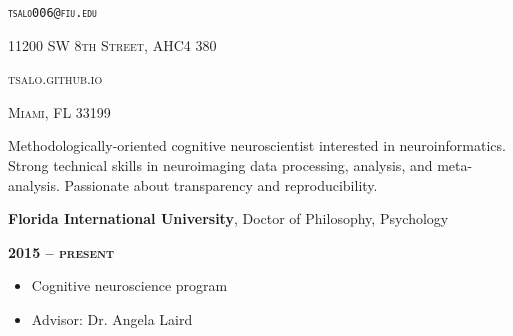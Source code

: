 \documentclass[10pt]{article}
\date{}
\newcommand{\namestyle}{\Huge \fontfamily{pcr}\selectfont}
\newcommand{\iconstyle}{\LARGE}
\newcommand{\headstyle}{\scshape \normalsize \textcolor{light-gray}}
\newcommand{\sectionstyle}{\LARGE \fontfamily{pcr}\selectfont}
\begin{document}
\begin{center}
	\namestyle{TAYLOR SALO}

	\bigskip

	\iconstyle{\href{https://github.com/tsalo}{\faGithubSquare}}
	\enspace
	\iconstyle{\href{https://www.researchgate.net/profile/Taylor_Salo}{}}
	\enspace
	\iconstyle{\href{https://scholar.google.com/citations?user=YbH1akIAAAAJ}{}}
	\enspace
	\iconstyle{\href{https://osf.io/iwpvm/}{}}
\end{center}

\begin{minipage}[t]{.5\linewidth}
\flushleft
\headstyle{\nolinkurl{tsalo006@fiu.edu}}
\end{minipage}
\hfill
\begin{minipage}[t]{.5\linewidth}
\flushright
\headstyle{11200 SW 8th Street, AHC4 380}
\end{minipage}

\begin{minipage}[t]{.3\linewidth}
\flushleft
\headstyle{tsalo.github.io}
\end{minipage}
\hfill
\begin{minipage}[t]{.7\linewidth}
\flushright
\headstyle{Miami, FL 33199}
\end{minipage}

\bigskip

\begin{center}\sectionstyle{PROFILE}\end{center}

Methodologically-oriented cognitive neuroscientist interested in
neuroinformatics. Strong technical skills in neuroimaging data
processing, analysis, and meta-analysis. Passionate about transparency
and reproducibility.

\bigskip

\begin{center}\sectionstyle{EDUCATION}\end{center}

\begin{minipage}[t]{.7\linewidth}
\flushleft
\noindent
\textbf{Florida International University}, Doctor of Philosophy,
Psychology
\end{minipage}
\hfill
\begin{minipage}[t]{.3\linewidth}
\flushright
\noindent
\textsc{\textbf{2015 -- present}}
\end{minipage}

\begin{itemize}[noitemsep, nolistsep]
\item
  Cognitive neuroscience program
\item
  Advisor: Dr. Angela Laird
\end{itemize}
\end{document}
